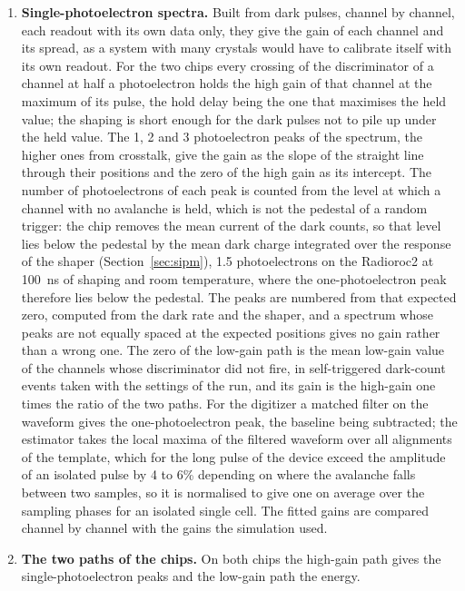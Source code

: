 \documentclass[11pt]{article}
\begin{document}
\begin{enumerate}
\item {\bf Single-photoelectron spectra.} Built from dark pulses, channel by
  channel, each readout with its own data only, they give the gain of each
  channel and its spread, as a system with many crystals would have to
  calibrate itself with its own readout. For the two chips every crossing
  of the discriminator of a channel at half a photoelectron holds the high
  gain of that channel at the maximum of its pulse, the hold delay being
  the one that maximises the held value; the shaping is short enough for
  the dark pulses not to pile up under the held value. The 1, 2 and 3
  photoelectron peaks of the spectrum, the higher ones from crosstalk, give
  the gain as the slope of the straight line through their positions and
  the zero of the high gain as its intercept. The number of photoelectrons
  of each peak is counted from the level at which a channel with no
  avalanche is held, which is not the pedestal of a random trigger: the
  chip removes the mean current of the dark counts, so that level lies
  below the pedestal by the mean dark charge integrated over the response
  of the shaper (Section~\ref{sec:sipm}), 1.5 photoelectrons on the
  Radioroc2 at 100~ns of shaping and room temperature, where the
  one-photoelectron peak therefore lies below the pedestal. The peaks are
  numbered from that expected zero, computed from the dark rate and the
  shaper, and a spectrum whose peaks are not equally spaced at the expected
  positions gives no gain rather than a wrong one. The zero of the low-gain path
  is the mean low-gain value of the channels whose discriminator did not
  fire, in self-triggered dark-count events taken with the settings of the
  run, and its gain is the high-gain one times the ratio of the two paths.
  For the digitizer a matched filter on the waveform gives the
  one-photoelectron peak, the baseline being subtracted; the estimator
  takes the local maxima of the filtered waveform over all alignments of
  the template, which for the long pulse of the device exceed the
  amplitude of an isolated pulse by 4 to 6\% depending on where the
  avalanche falls between two samples, so it is normalised to give one on
  average over the sampling phases for an isolated single cell. The fitted gains
  are compared channel by channel with the gains the simulation used.
\item {\bf The two paths of the chips.} On both chips the high-gain path
  gives the single-photoelectron peaks and the low-gain path the energy.

\end{enumerate}
\end{document}
